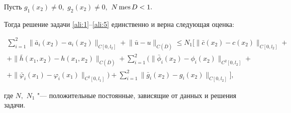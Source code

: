 \begin{theorem}[1]Пусть $g_1(x_2)\ne0,$ $g_2(x_2)\ne0,$ $N\mathop{\rm mes}D<1.$ 

Тогда решение задачи \eqref{ali:1}--\eqref{ali:5} единственно и верна следующая оценка{\rm :}

\begin{multline}

\sum\limits_{i=1}^2 

\bigl\|\bar{a}_i(x_2)-a_i(x_2)\bigr\|_{C[0,l_2]}+

\bigl\|\bar{u}-u\bigr\|_{C(\overline D)}\le 

N_1\biggl[ \bigl\|\bar{c}(x_2)-c(x_2)\bigr\|_{C[0,l_2]}+

\\

+\bigl\|\bar{h}(x_1,x_2)-h(x_1,x_2)\bigr\|_{C(\overline D)}+\sum\limits_{i=1}^2\bigl(

\bigl\|\bar{\phi}_i(x_2)-\phi_i(x_2)\bigr\|_{C^2[0,l_2]}+

\\

+\bigl\|\bar{\varphi}_i(x_1)-\varphi_i(x_1)\bigr\|_{C^2[0,l_1]}\bigr)+\sum\limits_{i=1}^2 \bigl \|\bar{g}_i(x_2)-g_i(x_2)\bigr\|_{C[0,l_2]}\biggr],

\label{ali:7}

\end{multline}

где  $N,$ $N_1$ "--- положительные постоянные{\rm ,} зависящие от данных и решения задачи.

\end{theorem}



\smallskip

